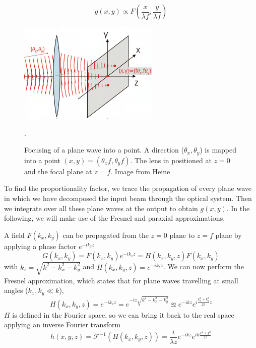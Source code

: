 \begin{equation}
    g(x,y) \propto F\left(\frac{x}{\lambda f}, \frac{y}{\lambda f}\right)
\end{equation}

\begin{figure}
    \centering
    \includegraphics[width=0.6\textwidth]{chapters/chapter_2/figures/fourier.png}
    \caption{Focusing of a plane wave into a point. A direction ($\theta_x, \theta_y$) is mapped into a point $(x,y) = (\theta_x f, \theta_y f)$. The lens in positioned at $z=0$ and the focal plane at $z=f$. Image from Heine \cite{article}}.
    \label{fig:fourier}
\end{figure}

To find the proportionality factor, we trace the propagation of every plane wave in which we have decomposed the input beam through the optical system. Then we integrate over all these plane waves at the output to obtain $g(x,y)$. In the following, we will make use of the Fresnel and paraxial approximations.

A field $F(k_x,k_y)$ can be propagated from the $z=0$ plane to $z=f$ plane by applying a phase factor $e^{-ik_zz}$
\begin{equation}
    G(k_x, k_y) = F(k_x,k_y) e^{-ik_zz} = H(k_x, k_y, z) F(k_x, k_y)
\end{equation}
with $k_z = \sqrt{k^2 - k_x^2 - k_y^2}$ and  $H(k_x, k_y, z) = e^{-ik_zz}$. We can now perform the Fresnel approximation, which states that for plane waves travelling at small angles ($k_x, k_y \ll k$),
\begin{equation}
    H(k_x, k_y, z) = e^{-ik_zz} = e^{-iz\sqrt{k^2 - k_x^2 - k_y^2}} \approxeq e^{-ikz}e^{i\frac{k_x^2 + k_y^2}{2k}z}
\end{equation}
$H$ is defined in the Fourier space, so we can bring it back to the real space applying an inverse Fourier transform
\begin{equation}
    h(x,y,z) = \mathcal{F}^{-1}(H(k_x, k_y, z)) = \frac{i}{\lambda z} e^{-ikz} e^{ik\frac{x^2+y^2}{2z}}
\end{equation}

